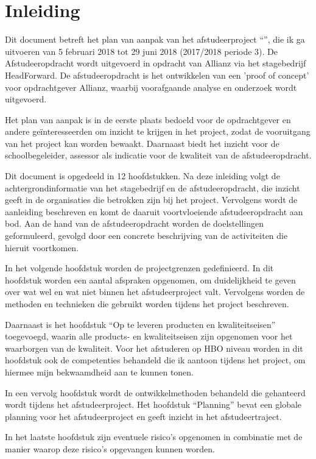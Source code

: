 \chapter{Inleiding}
Dit document betreft het plan van aanpak van het afstudeerproject ``\thesisTitle'', die ik ga uitvoeren van 5 februari 2018 tot 29 juni 2018 (2017/2018 periode 3). De Afstudeeropdracht wordt uitgevoerd in opdracht van Allianz via het stagebedrijf HeadForward. De afstudeeropdracht is het ontwikkelen van een 'proof of concept' voor opdrachtgever Allianz, waarbij voorafgaande analyse en onderzoek wordt uitgevoerd.\par

Het plan van aanpak is in de eerste plaats bedoeld voor de opdrachtgever en andere geïnteresseerden om inzicht te krijgen in het project, zodat de vooruitgang van het project kan worden bewaakt. Daarnaast biedt het inzicht voor de schoolbegeleider, assessor als indicatie voor de kwaliteit van de afstudeeropdracht.\par

Dit document is opgedeeld in 12 hoofdstukken. Na deze inleiding volgt de achtergrondinformatie van het stagebedrijf en de afstudeeropdracht, die inzicht geeft in de organisaties die betrokken zijn bij het project. Vervolgens wordt de aanleiding beschreven en komt de daaruit voortvloeiende afstudeeropdracht aan bod. Aan de hand van de afstudeeropdracht worden de doelstellingen geformuleerd, gevolgd door een concrete beschrijving van de activiteiten die hieruit voortkomen.\par

In het volgende hoofdstuk worden de projectgrenzen gedefinieerd. In dit hoofdstuk worden een aantal afspraken opgenomen, om duidelijkheid te geven over wat wel en wat niet binnen het afstudeerproject valt. Vervolgens worden de methoden en technieken die gebruikt worden tijdens het project beschreven.\par

Daarnaast is het hoofdstuk ``Op te leveren producten en kwaliteitseisen''  toegevoegd, waarin alle products- en kwaliteitseisen zijn opgenomen voor het waarborgen van de kwaliteit. Voor het afstuderen op HBO niveau worden in dit hoofdstuk ook de competenties behandeld die ik aantoon tijdens het project, om hiermee mijn bekwaamdheid aan te kunnen tonen. \par

In een vervolg hoofdstuk wordt de ontwikkelmethoden behandeld die gehanteerd wordt tijdens het afstudeerproject. Het hoofdstuk ``Planning'' bevat een globale planning voor het afstudeerproject en geeft inzicht in het afstudeertraject.\par

In het laatste hoofdstuk zijn eventuele risico's opgenomen in combinatie met de manier waarop deze risico's opgevangen kunnen worden.